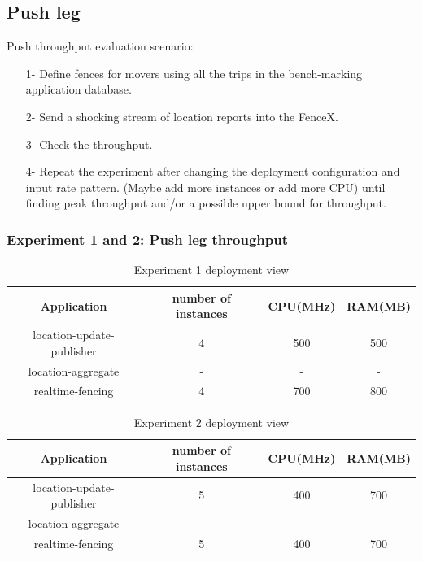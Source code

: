 \documentclass[a4]{report}
\begin{document}
    \subsection{Push leg}
    Push throughput evaluation scenario:
    \begin{itemize}
        \item[1-] Define fences for movers using all the trips in the bench-marking application database.
        \item[2-] Send a shocking stream of location reports into the FenceX.
        \item[3-] Check the throughput.
        \item[4-] Repeat the experiment after changing the deployment configuration and input rate pattern. (Maybe add
        more instances or add more CPU) until finding peak throughput and/or a possible upper bound for throughput.
    \end{itemize}

    \subsubsection{Experiment 1 and 2: Push leg throughput}
    \begin{table}[h!]
        \centering
        \begin{tabular}{|c|c|c|c|}
            \hline
            Application               & number of instances & CPU(MHz) & RAM(MB) \\
            \hline
            location-update-publisher & 4                   & 500      & 500     \\
            location-aggregate        & -                   & -        & -       \\
            realtime-fencing          & 4                   & 700      & 800     \\
            \hline
        \end{tabular}
        \caption{Experiment 1 deployment view}
        \label{table:ex1-dv}
    \end{table}

    \begin{table}[h!]
        \centering
        \begin{tabular}{|c|c|c|c|}
            \hline
            Application               & number of instances & CPU(MHz) & RAM(MB) \\
            \hline
            location-update-publisher & 5                   & 400      & 700     \\
            location-aggregate        & -                   & -        & -       \\
            realtime-fencing          & 5                   & 400      & 700     \\
            \hline
        \end{tabular}
        \caption{Experiment 2 deployment view}
        \label{table:ex2-dv}
    \end{table}
\end{document}
